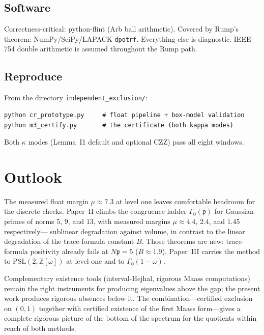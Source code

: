 \documentclass[11pt]{amsart}
\newcommand{\ZZ}{\mathbb{Z}}
\newcommand{\PSL}{\mathrm{PSL}}
\begin{document}
\subsection{Software}

Correctness-critical: python-flint (Arb ball arithmetic).  Covered by
Rump's theorem: NumPy/SciPy/LAPACK \texttt{dpotrf}.  Everything else is
diagnostic.  IEEE-754 double arithmetic is assumed throughout the Rump
path.

\subsection{Reproduce}

From the directory \texttt{independent\_exclusion/}:
\begin{verbatim}
python cr_prototype.py     # float pipeline + box-model validation
python m3_certify.py       # the certificate (both kappa modes)
\end{verbatim}
Both $\kappa$ modes (Lemma~I1 default and optional CZZ) pass all eight
windows.

\section{Outlook}

The measured float margin $\mu\approx 7.3$ at level one leaves comfortable
headroom for the discrete checks.  Paper~II climbs the congruence ladder
$\Gamma_0(\mathfrak{p})$ for Gaussian primes of norms $5$, $9$, and $13$,
with measured margins $\mu\approx 4.4$, $2.4$, and $1.45$ respectively---
sublinear degradation against volume, in contrast to the linear
degradation of the trace-formula constant $B$.  Those theorems are new:
trace-formula positivity already fails at $N\mathfrak{p}=5$ ($B\approx 1.9$).
Paper~III carries the method to $\PSL(2,\ZZ[\omega])$ at level one and to
$\Gamma_0(1-\omega)$.

Complementary existence tools (interval-Hejhal, rigorous Maass
computations) remain the right instruments for producing eigenvalues
above the gap; the present work produces rigorous absences below it.
The combination---certified exclusion on $(0,1)$ together with certified
existence of the first Maass form---gives a complete rigorous picture of
the bottom of the spectrum for the quotients within reach of both
methods.

\appendix
\end{document}
